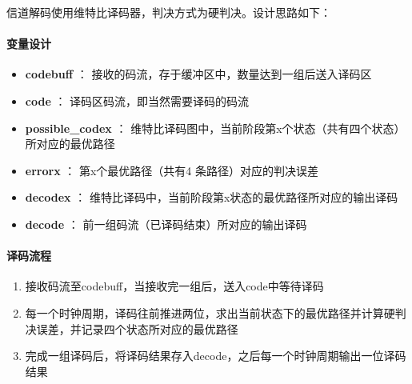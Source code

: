 信道解码使用维特比译码器，判决方式为硬判决。设计思路如下：

\paragraph{变量设计}

\begin{itemize}
\item \textbf{codebuff} ： 接收的码流，存于缓冲区中，数量达到一组后送入译码区
\item \textbf{code} ： 译码区码流，即当然需要译码的码流
\item \textbf{possible\_codex} ： 维特比译码图中，当前阶段第x个状态（共有四个状态）所对应的最优路径
\item \textbf{errorx} ： 第x个最优路径（共有4 条路径）对应的判决误差
\item \textbf{decodex} ： 维特比译码中，当前阶段第x状态的最优路径所对应的输出译码
\item \textbf{decode} ： 前一组码流（已译码结束）所对应的输出译码
\end{itemize}

\paragraph{译码流程}

\begin{enumerate}
\item 接收码流至codebuff，当接收完一组后，送入code中等待译码
\item 每一个时钟周期，译码往前推进两位，求出当前状态下的最优路径并计算硬判决误差，并记录四个状态所对应的最优路径
\item 完成一组译码后，将译码结果存入decode，之后每一个时钟周期输出一位译码结果
\end{enumerate}